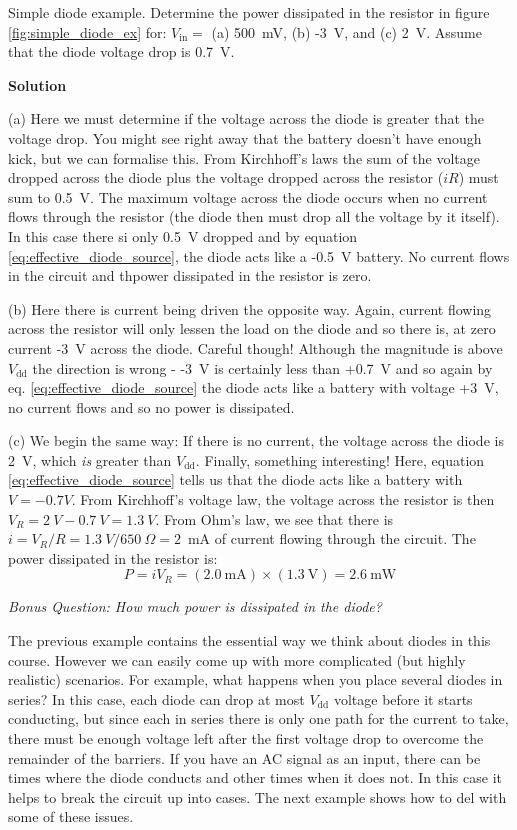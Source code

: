 \documentclass{tufte-book}
\newcommand\Solution{\par\textbf{\textsf{Solution}}\par\medskip}
\begin{document}
\begin{myexample}[label = ex:simple_diode]{Simple diode example.}
Determine the power dissipated in the resistor in figure \ref{fig:simple_diode_ex} for: $V_\text{in} = $ (a) 500~mV, (b) -3~V, and (c) 2~V. Assume that the diode voltage drop is 0.7~V.
\Solution
(a) Here we must determine if the voltage across the diode is greater that the voltage drop. You might see right away that the battery doesn't have enough kick, but we can formalise this. From Kirchhoff's laws the sum of the voltage dropped across the diode plus the voltage dropped across the resistor ($iR$) must sum to 0.5~V. The maximum voltage across the diode occurs when no current flows through the resistor (the diode then must drop all the voltage by it itself). In this case there si only 0.5~V dropped and by equation \ref{eq:effective_diode_source}, the diode acts like a -0.5~V battery. No current flows in the circuit and thpower dissipated in the resistor is zero.

(b) Here there is current being driven the opposite way. Again, current flowing across the resistor will only lessen the load on the diode and so there is, at zero current -3~V across the diode. Careful though! Although the magnitude is above $V_\text{dd}$ the direction is wrong - -3~V is certainly less than +0.7~V and so again by eq. \ref{eq:effective_diode_source} the diode acts like a battery with voltage +3~V, no current flows and so no power is dissipated.

(c) We begin the same way: If there is no current, the voltage across the diode is 2~V, which \textit{is} greater than $V_\text{dd}$. Finally, something interesting! Here, equation \ref{eq:effective_diode_source} tells us that the diode acts like a battery with $V=-0.7V$. From Kirchhoff's voltage law, the voltage across the resistor is then $V_R = 2~V-0.7~V = 1.3~V$. From Ohm's law, we see that there is $i = V_R/R = 1.3~V/650~\Omega = 2$~mA of current flowing through the circuit. The power dissipated in the resistor is:
$$
P = iV_R = \left(2.0~\text{mA}\right)\times\left(1.3~\text{V}\right) = 2.6~\text{mW}
$$

\textit{Bonus Question: How much power is dissipated in the diode?}
\end{myexample}

The previous example contains the essential way we think about diodes in this course. However we can easily come up with more complicated (but highly realistic) scenarios. For example, what happens when you place several diodes in series? In this case, each diode can drop at most $V_\text{dd}$ voltage before it starts conducting, but since each in series there is only one path for the current to take, there must be enough voltage left after the first voltage drop to overcome the remainder of the barriers. If you have an AC signal as an input, there can be times where the diode conducts and other times when it does not. In this case it helps to break the circuit up into cases. The next example shows how to del with some of these issues.
\end{document}
